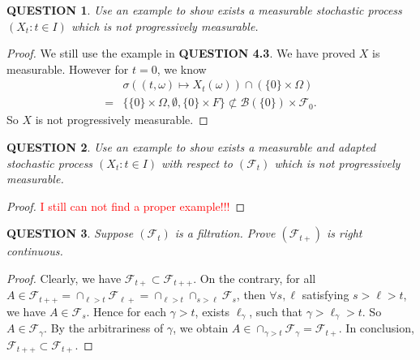 \documentclass[12pt]{article}
\renewcommand{\b}{\mathscr{B}}
\renewcommand{\(}{\left(}%
\renewcommand{\)}{\right)}%
\renewcommand{\[}{\left[}%
\renewcommand{\]}{\right]}%
\newcommand{\f}{\mathscr{F}}
\newtheorem{question}{QUESTION}[section]}
\newtheorem{proof}{Proof.}}
\begin{document}
  \begin{question}
   Use an example to show exists a measurable stochastic process $(X_t:t\in I)$ which is not progressively measurable.
  \end{question}
  \begin{proof}
   We still use the example in {\bfseries QUESTION 4.3}. We have proved $X$ is measurable. However for $t=0$, we know
   \begin{equation*}
    \begin{split}
     &\sigma((t,\omega )\mapsto X_t(\omega ))\cap (\{0\}\times \Omega)\\
     =&\{\{0\}\times\Omega,\emptyset, \{0\}\times F\}\not\subset \b(\{0\})\times\f_0.
    \end{split}
   \end{equation*}
   So $X$ is not progressively measurable.
  \end{proof}

  \begin{question}
   Use an example to show exists a measurable and adapted stochastic process $(X_t:t\in I)$ with respect to $(\f_t)$ which is not progressively measurable.
  \end{question}
  \begin{proof}
   \textcolor{red}{I still can not find a proper example!!!}
  \end{proof}

  \begin{question}
   Suppose $(\f_t)$ is a filtration. Prove $(\f_{t+})$ is right continuous.
  \end{question}
  \begin{proof}
   Clearly, we have $\f_{t+}\subset \f_{t++}$. On the contrary, for all $A\in\f_{t++}=\cap_{\ell>t}\f_{\ell+}= \cap_{\ell>t}\cap_{s>\ell}\f_s$, then $\forall  s,\ell$ satisfying $s>\ell>t$, we have $A\in \f_s$. Hence for each $\gamma>t$, exists $\ell_\gamma$, such that $\gamma>\ell_\gamma>t$. So $A\in\f_\gamma$. By the arbitrariness of $\gamma$, we obtain $A\in \cap_{\gamma>t}\f_\gamma=\f_{t+}$. In conclusion, $\f_{t++}\subset\f_{t+}$.
  \end{proof}
\end{document}
